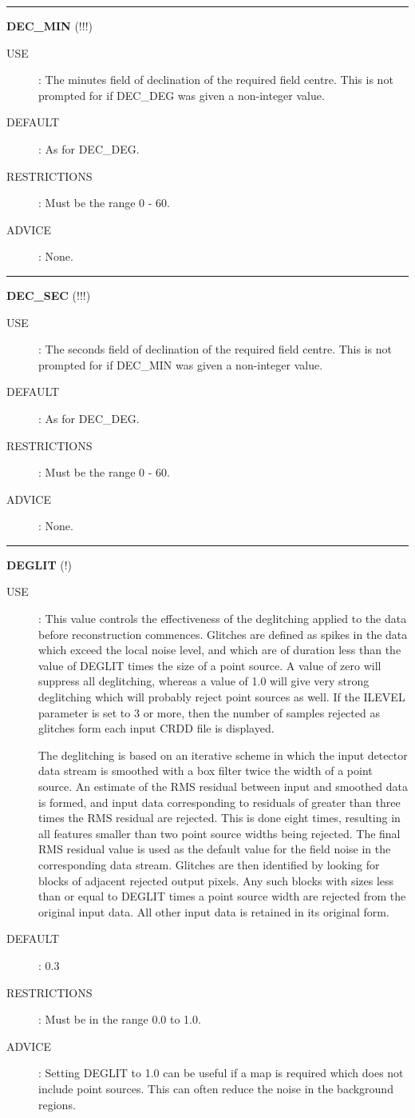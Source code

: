 \rule{\textwidth}{0.3mm}
{\Large {\bf DEC\_MIN} (!!!)}
\begin{description}
\item [USE]:
The minutes field of declination of the required field centre. This is not
prompted for if DEC\_DEG was given a non-integer value.
\item [DEFAULT]:
As for DEC\_DEG.
\item [RESTRICTIONS]:
Must be the range 0 - 60.
\item [ADVICE]:
None.
\end {description}

\rule{\textwidth}{0.3mm}
{\Large {\bf DEC\_SEC} (!!!)}
\begin{description}
\item [USE]:
The seconds field of declination of the required field centre. This is not
prompted for if DEC\_MIN was given a non-integer value.
\item [DEFAULT]:
As for DEC\_DEG.
\item [RESTRICTIONS]:
Must be the range 0 - 60.
\item [ADVICE]:
None.
\end {description}

\rule{\textwidth}{0.3mm}
{\Large {\bf DEGLIT } (!)}
\begin{description}
\item [USE]:
This value controls the effectiveness of the deglitching applied to the data
before reconstruction commences. Glitches are defined as spikes in the
data which exceed the local noise level, and which are of duration less
than the value of DEGLIT times the size of a point source. A value of zero will
suppress all deglitching, whereas a value of 1.0 will give very strong
deglitching which will probably reject point sources as well. If the ILEVEL
parameter is set to 3 or more, then the number of samples rejected as glitches
form each input CRDD file is displayed.

The deglitching is based on an iterative scheme in which the input detector data
stream is smoothed with a box filter twice the width of a point source. An
estimate of the RMS residual between input and smoothed data is formed, and
input data corresponding to residuals of greater than three times the RMS
residual are rejected. This is done eight times, resulting in all features
smaller than two point source widths being rejected. The final RMS residual
value is used as the default value for the field noise in the corresponding data
stream. Glitches are then identified by looking for blocks of adjacent rejected
output pixels. Any such blocks with sizes less than or equal to DEGLIT times a
point source width are rejected from the original input data. All other input
data is retained in its original form.


\item [DEFAULT]:
0.3
\item [RESTRICTIONS]:
Must be in the range 0.0 to 1.0.
\item [ADVICE]:
Setting DEGLIT to 1.0 can be useful if a map is required which does not
include point sources. This can often reduce the noise in the background
regions.
\end {description}


